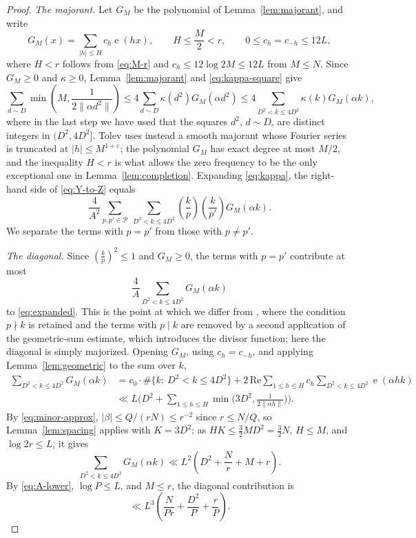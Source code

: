 \documentclass[11pt]{amsart}
\numberwithin{equation}{section}
\numberwithin{figure}{section}
\theoremstyle{definition}
\newcommand{\e}{\operatorname{e}}
\newcommand{\eps}{\varepsilon}
\begin{document}
\begin{proof}
\medskip\noindent\emph{The majorant.}
Let $G_M$ be the polynomial of Lemma~\ref{lem:majorant}, and write
\begin{equation}\label{eq:G-here}
  G_M(x)=\sum_{|h|\le H}c_h\e(hx),\qquad H\le\frac M2<r,\qquad
  0\le c_h=c_{-h}\le12L,
\end{equation}
where $H<r$ follows from \eqref{eq:M-r} and $c_h\le12\log2M\le12L$ from
$M\le N$.  Since $G_M\ge0$ and $\kappa\ge0$, Lemma~\ref{lem:majorant} and
\eqref{eq:kappa-square} give
\begin{equation}\label{eq:Y-to-Z}
  \sum_{d\sim D}\min\left(M,\frac1{2\|\alpha d^2\|}\right)
  \le4\sum_{d\sim D}\kappa(d^2)G_M(\alpha d^2)
  \le4\sum_{D^2<k\le4D^2}\kappa(k)G_M(\alpha k),
\end{equation}
where in the last step we have used that the squares $d^2$, $d\sim D$,
are distinct integers in $(D^2,4D^2]$.  Tolev uses instead a smooth
majorant whose Fourier series is truncated at $|h|\le M^{1+\eps}$; the
polynomial $G_M$ has exact degree at most $M/2$, and the inequality
$H<r$ is what allows the zero frequency to be the only exceptional one in
Lemma~\ref{lem:completion}.  Expanding \eqref{eq:kappa}, the right-hand
side of \eqref{eq:Y-to-Z} equals
\begin{equation}\label{eq:expanded}
  \frac4{A^2}\sum_{p,p'\in\mathcal P}\ \sum_{D^2<k\le4D^2}
  \left(\frac kp\right)\left(\frac k{p'}\right)G_M(\alpha k).
\end{equation}
We separate the terms with $p=p'$ from those with $p\ne p'$.

\medskip\noindent\emph{The diagonal.}
Since $(\tfrac kp)^2\le1$ and $G_M\ge0$, the terms with $p=p'$ contribute
at most
\[
  \frac4A\sum_{D^2<k\le4D^2}G_M(\alpha k)
\]
to \eqref{eq:expanded}.  This is the point at which we differ from
\cite{Tolev}, where the condition $p\nmid k$ is retained and the terms with
$p\mid k$ are removed by a second application of the geometric-sum
estimate, which introduces the divisor function; here the diagonal is
simply majorized.  Opening $G_M$, using $c_h=c_{-h}$, and applying
Lemma~\ref{lem:geometric} to the sum over $k$,
\begin{align*}
  \sum_{D^2<k\le4D^2}G_M(\alpha k)
  &=c_0\cdot\#\{k:\ D^2<k\le4D^2\}
   +2\,\mathrm{Re}\sum_{1\le h\le H}c_h\sum_{D^2<k\le4D^2}\e(\alpha hk)\\
  &\ll L\bigg(D^2+\sum_{1\le h\le H}\min\Big(3D^2,\frac1{2\|\alpha h\|}\Big)\bigg).
\end{align*}
By \eqref{eq:minor-approx}, $|\beta|\le Q/(rN)\le r^{-2}$ since
$r\le N/Q$, so Lemma~\ref{lem:spacing} applies with $K=3D^2$; as
$HK\le\tfrac32MD^2=\tfrac32N$, $H\le M$, and $\log 2r\le L$, it gives
\[
  \sum_{D^2<k\le4D^2}G_M(\alpha k)\ll L^2\left(D^2+\frac Nr+M+r\right).
\]
By \eqref{eq:A-lower}, $\log P\le L$, and $M\le r$, the diagonal
contribution is
\begin{equation}\label{eq:diag-final}
  \ll L^3\left(\frac N{Pr}+\frac{D^2}P+\frac rP\right).
\end{equation}


\end{proof}
\end{document}
